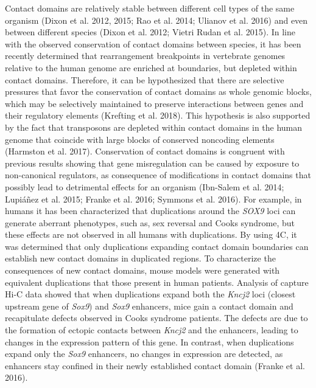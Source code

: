 Contact domains are relatively stable between different cell types of the same organism (Dixon et al. 2012, 2015; Rao et al. 2014; Ulianov et al. 2016) and even between different species (Dixon et al. 2012; Vietri Rudan et al. 2015). In line with the observed conservation of contact domains between species, it has been recently determined that rearrangement breakpoints in vertebrate genomes relative to the human genome are enriched at boundaries, but depleted within contact domains. Therefore, it can be hypothesized that there are selective pressures that favor the conservation of contact domains as whole genomic blocks, which may be selectively maintained to preserve interactions between genes and their regulatory elements (Krefting et al. 2018). This hypothesis is also supported by the fact that transposons are depleted within contact domains in the human genome that coincide with large blocks of conserved noncoding elements (Harmston et al. 2017). Conservation of contact domains is congruent with previous results showing that gene misregulation can be caused by exposure to non-canonical regulators, as consequence of modifications in contact domains that possibly lead to detrimental effects for an organism (Ibn-Salem et al. 2014; Lupiáñez et al. 2015; Franke et al. 2016; Symmons et al. 2016). For example, in humans it has been characterized that duplications around the \textit{SOX9} loci can generate aberrant phenotypes, such as, sex reversal and Cooks syndrome, but these effects are not observed in all humans with duplications. By using 4C, it was determined that only duplications expanding contact domain boundaries can establish new contact domains in duplicated regions. To characterize the consequences of new contact domains, mouse models were generated with equivalent duplications that those present in human patients. Analysis of capture Hi-C data showed that when duplications expand both the \textit{Kncj2} loci (closest upstream gene of \textit{Sox9}) and \textit{Sox9} enhancers, mice gain a contact domain and recapitulate defects observed in Cooks syndrome patients. The defects are due to the formation of ectopic contacts between \textit{Kncj2} and the enhancers, leading to changes in the expression pattern of this gene. In contrast, when duplications expand only the \textit{Sox9} enhancers, no changes in expression are detected, as enhancers stay confined in their newly established contact domain (Franke et al. 2016).\\


